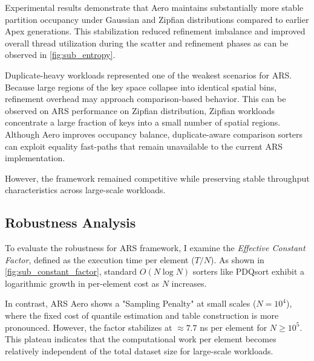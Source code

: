 Experimental results demonstrate that Aero maintains substantially more stable partition occupancy under Gaussian and Zipfian distributions compared to earlier Apex generations.
This stabilization reduced refinement imbalance and improved overall thread utilization during the scatter and refinement phases as can be observed in \cref{fig:sub_entropy}.

Duplicate-heavy workloads represented one of the weakest scenarios for ARS.
Because large regions of the key space collapse into identical spatial bins, refinement overhead may approach comparison-based behavior.
This can be observed on ARS performance on Zipfian distribution, Zipfian workloads concentrate a large fraction of keys into a small number of spatial regions.
Although Aero improves occupancy balance, duplicate-aware comparison sorters can exploit equality fast-paths that remain unavailable to the current ARS implementation.

However, the framework remained competitive while preserving stable throughput characteristics across large-scale workloads.

\subsection{Robustness Analysis}
To evaluate the robustness for ARS framework, I examine the \textit{Effective Constant Factor}, defined as the execution time per element ($T/N$).
As shown in \cref{fig:sub_constant_factor}, standard $O(N \log N)$ sorters like PDQsort exhibit a logarithmic growth in per-element cost as $N$ increases. 

In contrast, ARS Aero shows a "Sampling Penalty" at small scales ($N=10^4$), where the fixed cost of quantile estimation and table construction is more pronounced.
However, the factor stabilizes at $\approx 7.7$ ns per element for $N \geq 10^5$.
This plateau indicates that the computational work per element becomes relatively independent of the total dataset size for large-scale workloads.

